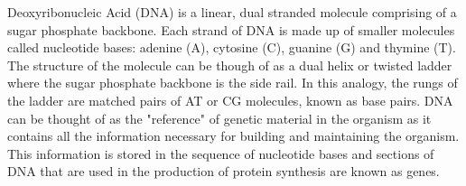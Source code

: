 




Deoxyribonucleic Acid (DNA) is a linear, dual stranded molecule comprising of a sugar phosphate backbone. Each strand of DNA is made up of smaller molecules called nucleotide bases: adenine (A), cytosine (C), guanine (G) and thymine (T). The structure of the molecule can be though of as a dual helix or twisted ladder where the sugar phosphate backbone is the side rail. In this analogy, the rungs of the ladder are matched pairs of AT or CG molecules, known as base pairs. DNA can be thought of as the "reference" of genetic material in the organism as it contains all the information necessary for building and maintaining the organism. This information is stored in the sequence of nucleotide bases and sections of DNA that are used in the production of protein synthesis are known as genes. 

